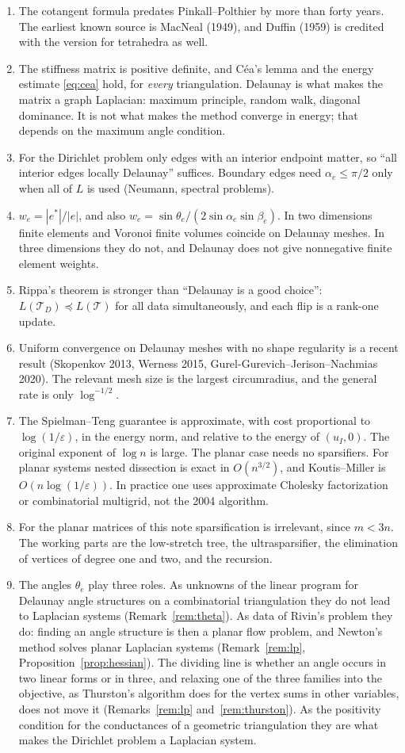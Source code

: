 \documentclass[11pt]{amsart}
\theoremstyle{definition}
\theoremstyle{remark}
\newcommand{\cT}{\mathcal{T}}
\newcommand{\lo}{\preccurlyeq}
\newcommand{\eps}{\varepsilon}
\begin{document}
\begin{enumerate}[leftmargin=*,itemsep=3pt]
\item The cotangent formula predates Pinkall--Polthier by more than forty years. The earliest known source is MacNeal (1949), and Duffin (1959) is credited with the version for tetrahedra as well.
\item The stiffness matrix is positive definite, and C\'ea's lemma and the energy estimate \eqref{eq:cea} hold, for \emph{every} triangulation. Delaunay is what makes the matrix a graph Laplacian: maximum principle, random walk, diagonal dominance.
It is not what makes the method converge in energy; that depends on the maximum angle condition.
\item For the Dirichlet problem only edges with an interior endpoint matter, so ``all interior edges locally Delaunay'' suffices. Boundary edges need $\alpha_e\le\pi/2$ only when all of $L$ is used (Neumann, spectral problems).
\item $w_e=|e^*|/|e|$, and also $w_e=\sin\theta_e/(2\sin\alpha_e\sin\beta_e)$. In two dimensions finite elements and Voronoi finite volumes coincide on Delaunay meshes. In three dimensions they do not, and Delaunay does not give nonnegative finite element weights.
\item Rippa's theorem is stronger than ``Delaunay is a good choice'': $L(\cT_D)\lo L(\cT)$ for all data simultaneously, and each flip is a rank-one update.
\item Uniform convergence on Delaunay meshes with no shape regularity is a recent result (Skopenkov 2013, Werness 2015, Gurel-Gurevich--Jerison--Nachmias 2020). The relevant mesh size is the largest circumradius, and the general rate is only $\log^{-1/2}$.
\item The Spielman--Teng guarantee is approximate, with cost proportional to $\log(1/\eps)$, in the energy norm, and relative to the energy of $(u_I,0)$. The original exponent of $\log n$ is large. The planar case needs no sparsifiers. For planar systems nested dissection is exact in $O(n^{3/2})$, and Koutis--Miller is $O(n\log(1/\eps))$.
In practice one uses approximate Cholesky factorization or combinatorial multigrid, not the 2004 algorithm.
\item For the planar matrices of this note sparsification is irrelevant, since $m<3n$. The working parts are the low-stretch tree, the ultrasparsifier, the elimination of vertices of degree one and two, and the recursion.
\item The angles $\theta_e$ play three roles. As unknowns of the linear program for Delaunay angle structures on a combinatorial triangulation they do not lead to Laplacian systems (Remark~\ref{rem:theta}). As data of Rivin's problem they do: finding an angle structure is then a planar flow problem, and Newton's method solves planar Laplacian systems (Remark~\ref{rem:lp}, Proposition~\ref{prop:hessian}). The dividing line is whether an angle occurs in two linear forms or in three, and relaxing one of the three families into the objective, as Thurston's algorithm does for the vertex sums in other variables, does not move it (Remarks~\ref{rem:lp} and~\ref{rem:thurston}). As the positivity condition for the conductances of a geometric triangulation they are what makes the Dirichlet problem a Laplacian system.

\end{enumerate}
\end{document}
